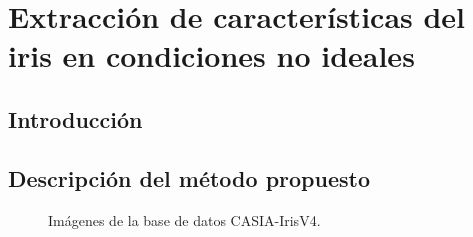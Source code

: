 
\chapter{Extracción de características del iris en condiciones no ideales} %

\label{Capítulo 4} %




\section{Introducción}






\section{Descripción del método propuesto}



\begin{figure}[htbp]
\centering
{}
\caption{Imágenes de la base de datos CASIA-IrisV4.} \label{fig:señales}
\end{figure}

